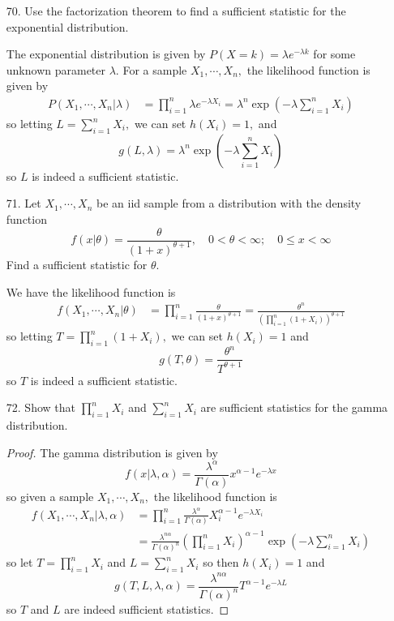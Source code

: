 \documentclass{article}
\begin{document}
\begin{itemize}
\begin{soln}
		\end{soln}

	\item[70.] Use the factorization theorem to find a sufficient statistic for the exponential distribution.
		\begin{soln}
			The exponential distribution is given by $P(X=k)=\lambda e^{-\lambda k}$ for some unknown parameter $\lambda.$ For a sample $X_1, \cdots, X_n,$ the likelihood function is given by 
			\begin{align*}
				P(X_1, \cdots, X_n|\lambda) &= \prod_{i=1}^n \lambda e^{-\lambda X_i} = \lambda^n \exp{\left( -\lambda \sum_{i=1}^{n} X_i \right)}
			\end{align*} so letting $L=\displaystyle \sum_{i=1}^{n} X_i,$ we can set $h(X_i)=1,$ and \[g(L, \lambda) = \lambda^n \exp{\left( -\lambda\sum_{i=1}^{n} X_i \right)}\] so $L$ is indeed a sufficient statistic.
			
		\end{soln}

	\item[71.] Let $X_1, \cdots, X_n$ be an iid sample from a distribution with the density function \[f(x|\theta)=\frac{\theta}{(1+x)^{\theta+1}}, \quad 0<\theta<\infty; \quad 0\le x<\infty\] Find a sufficient statistic for $\theta.$
		\begin{soln}
			We have the likelihood function is
			\begin{align*}
				f(X_1,\cdots, X_n|\theta) &= \prod_{i=1}^n \frac{\theta}{(1+x)^{\theta+1}} = \frac{\theta^n}{\left( \displaystyle\prod_{i=1}^n (1+X_i) \right)^{\theta+1}}
			\end{align*} so letting $T=\displaystyle\prod_{i=1}^n (1+X_i),$ we can set $h(X_i)=1$ and \[g(T, \theta) = \frac{\theta^n}{T^{\theta+1}}\] so $T$ is indeed a sufficient statistic.
			
		\end{soln}

	\item[72.] Show that $\displaystyle \prod_{i=1}^n X_i$ and $\displaystyle\sum_{i=1}^{n} X_i$ are sufficient statistics for the gamma distribution.
		\begin{proof}
			The gamma distribution is given by \[f(x|\lambda, \alpha)=\frac{\lambda^\alpha}{\Gamma(\alpha)}x^{\alpha-1} e^{-\lambda x}\] so given a sample $X_1, \cdots, X_n,$ the likelihood function is 
			\begin{align*}
				f(X_1, \cdots, X_n|\lambda, \alpha) &= \prod_{i=1}^n \frac{\lambda^\alpha}{\Gamma(\alpha)}X_i^{\alpha-1} e^{-\lambda X_i} \\
				&= \frac{\lambda^{n\alpha}}{\Gamma(\alpha)^n}\left( \prod_{i=1}^n X_i \right)^{\alpha-1} \exp{\left( -\lambda \sum_{i=1}^{n} X_i \right)}
			\end{align*} so let $T=\displaystyle\prod_{i=1}^n X_i$ and $L=\displaystyle\sum_{i=1}^{n} X_i$ so then $h(X_i)=1$ and \[g(T, L, \lambda, \alpha) = \frac{\lambda^{n\alpha}}{\Gamma(\alpha)^n} T^{\alpha-1} e^{-\lambda L}\] so $T$ and $L$ are indeed sufficient statistics.
			
		\end{proof}

\end{itemize}
\end{document}
